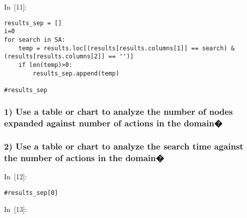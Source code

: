 \documentclass{article}
\begin{document}
In~[11]:

    
\begin{verbatim}results_sep = []
i=0
for search in SA:
    temp = results.loc[(results[results.columns[1]] == search) & (results[results.columns[2]] == '')]
    if len(temp)>0:
        results_sep.append(temp)
            
#results_sep
\end{verbatim}










\subsubsection*{1) Use a table or chart to analyze the number of nodes expanded against number of actions in the domain�}\subsubsection*{2) Use a table or chart to analyze the search time against the number of actions in the domain�}





In~[12]:

    
\begin{verbatim}#results_sep[0]
\end{verbatim}








In~[13]:
\end{document}
